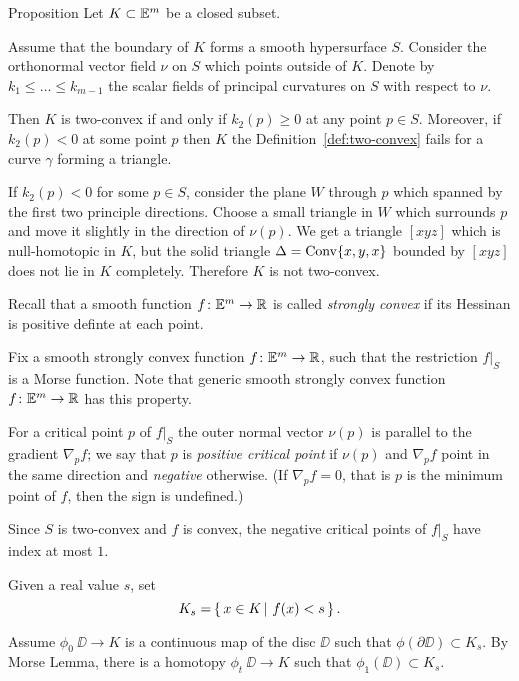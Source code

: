 \begin{thm}{Proposition}\label{prop:two-cove+smooth}
Let $K\subset \EE^m$ be a closed subset.

Assume that the boundary of $K$ forms a smooth hypersurface $S$.
Consider the orthonormal vector field $\nu$ on $S$ which points outside of $K$.
Denote by $k_1\le \dots\le k_{m-1}$ the scalar fields of principal curvatures on $S$ with respect to $\nu$.

Then $K$ is two-convex if and only if $k_2(p)\ge 0$ at any point $p\in S$.
Moreover, if $k_2(p)<0$ at some point $p$ then $K$ the Definition~\ref{def:two-convex} fails for a curve $\gamma$ forming a triangle.  
\end{thm}

If $k_2(p)<0$ for some $p\in S$,
consider the plane $W$ through $p$ which spanned by the first two principle directions.
Choose a small triangle in $W$ which surrounds $p$ and move it slightly in the direction of $\nu(p)$.
We get a triangle $[xyz]$ which is null-homotopic in $K$,
but the solid triangle $\Delta=\mathop{\rm Conv}\nolimits\{x,y,x\}$ bounded by $[xyz]$ does not lie in $K$ completely.
Therefore $K$ is not two-convex.

Recall that a smooth function $f\:\EE^m\to\RR$ is called \emph{strongly convex} if its Hessinan is
 positive definte at each point.

Fix a smooth strongly
convex function $f\:\EE^m\to\RR$,
such that the restriction $f|_S$ is a Morse function.
Note that generic smooth strongly convex function $f\:\EE^m\to\RR$ has this property.

For a critical point $p$ of $f|_S$ the outer normal vector $\nu(p)$ is parallel to the gradient $\nabla_pf$;
we say that $p$ is \emph{positive critical point}
if $\nu(p)$ and $\nabla_p f$ point in the same direction 
and \emph{negative} otherwise.
(If $\nabla_pf=0$, that is $p$ is the minimum point of $f$, then the sign is undefined.)

Since $S$ is two-convex and $f$ is convex, 
the negative critical points of $f|_S$
have index at most $1$.

Given a real value $s$, set 
\[K_s=\set{x\in K}{f(x)<s}.\]

Assume  $\phi_0\:\DD\to K$ is a continuous map of the disc $\DD$
such that $\phi(\partial \DD)\subset K_s$.
By Morse Lemma, 
there is a homotopy $\phi_t\:\DD\to K$ such that 
$\phi_1(\DD)\subset K_s$.

